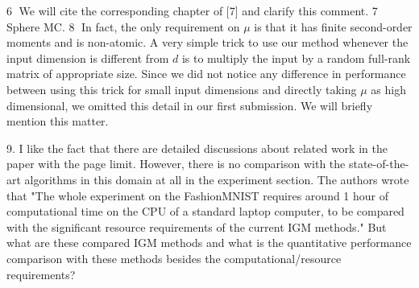 \documentclass{article}
\newcommand{\rev}[1]{{\color{red} #1}}
\newcommand{\umut}[1]{{\color{blue} #1}}
\newcommand{\antoine}[1]{{\color{orange} #1}}
\newcommand{\ubul}[1]{{\large \color{red} \textcircled{\small #1}}}
\begin{document}
%
%
\ubul{6} We will cite the corresponding chapter of [7] and clarify this comment.
%
%
%
\ubul{7} \umut{Sphere MC.}
%
%
\ubul{8} In fact, the only requirement on $\mu$ is that it has finite second-order moments and is non-atomic. A very simple trick to use our method whenever the input dimension is different from $d$ is to multiply the input by a random full-rank matrix of appropriate size. Since we did not notice any difference in performance between using this trick for small input dimensions and directly taking $\mu$ as high dimensional, we omitted this detail in our first submission. We will briefly mention this matter.

\rev{9. I like the fact that there are detailed discussions about related work in the paper with the page limit. However, there is no comparison with the state-of-the-art algorithms in this domain at all in the experiment section. The authors wrote that "The whole experiment on the FashionMNIST requires around 1 hour of computational time on the CPU of a standard laptop computer, to be compared with the significant resource requirements of the current IGM methods." But what are these compared IGM methods and what is the quantitative performance comparison with these methods besides the computational/resource requirements?}
\end{document}
